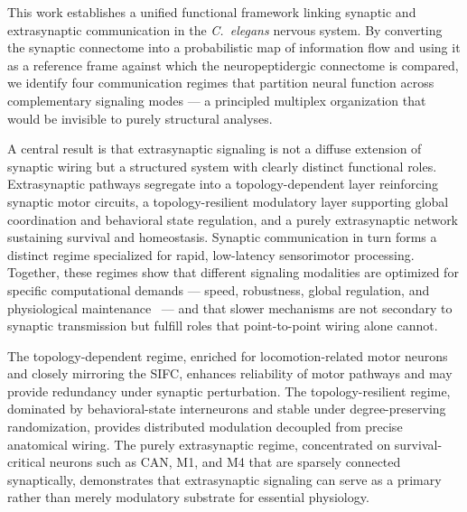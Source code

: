 \documentclass[prx,superscriptaddres, twocolumn]{revtex4-2}
\begin{document}
This work establishes a unified functional framework linking synaptic and extrasynaptic
communication in the \emph{C.~elegans} nervous system. By converting the synaptic
connectome into a probabilistic map of information flow and using it as a reference frame
against which the neuropeptidergic connectome is compared, we identify four communication
regimes that partition neural function across complementary signaling modes --- a
principled multiplex organization that would be invisible to purely structural analyses.

A central result is that extrasynaptic signaling is not a diffuse extension of synaptic
wiring but a structured system with clearly distinct functional roles. Extrasynaptic
pathways segregate into a topology-dependent layer reinforcing synaptic motor circuits, a
topology-resilient modulatory layer supporting global coordination and behavioral state
regulation, and a purely extrasynaptic network sustaining survival and homeostasis.
Synaptic communication in turn forms a distinct regime specialized for rapid, low-latency
sensorimotor processing. Together, these regimes show that different signaling modalities
are optimized for specific computational demands --- speed, robustness, global regulation,
and physiological maintenance~\cite{bentley2016multilayer,atkinson2021ascaris} --- and
that slower mechanisms are not secondary to synaptic transmission but fulfill roles that
point-to-point wiring alone cannot.

The topology-dependent regime, enriched for locomotion-related motor neurons and closely
mirroring the SIFC, enhances reliability of motor pathways and may provide redundancy
under synaptic perturbation. The topology-resilient regime, dominated by behavioral-state
interneurons and stable under degree-preserving randomization, provides distributed
modulation decoupled from precise anatomical wiring. The purely extrasynaptic regime,
concentrated on survival-critical neurons such as CAN, M1, and M4 that are sparsely
connected synaptically, demonstrates that extrasynaptic signaling can serve as a primary
rather than merely modulatory substrate for essential physiology.
\end{document}
